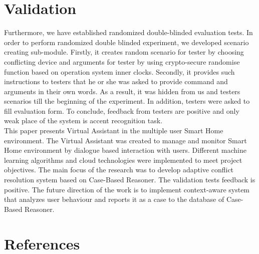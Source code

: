 \documentclass{llncs}
\begin{document}
    \section{Validation}
    Furthermore, we have established randomized double-blinded evaluation tests. In order to perform randomized double
    blinded experiment, we developed scenario creating sub-module. Firstly, it creates random scenario for tester by choosing
    conflicting device and arguments for tester by using crypto-secure randomise function based on operation system inner
    clocks. Secondly, it provides such instructions to testers that he or she was
    asked to provide command and arguments in their own words. As a result, it was hidden from us and testers scenarios till
    the beginning of the experiment. In addition, testers were asked to fill evaluation form. To conclude, feedback from
    testers are positive and only weak place of the system is accent recognition task.\\
    This paper presents Virtual Assistant in the multiple user Smart Home environment. The Virtual Assistant was created
    to manage and monitor Smart Home environment by dialogue based interaction with users. Different machine learning
    algorithms and cloud technologies were implemented to meet project objectives. The main focus of the research was to
    develop adaptive conflict resolution system based on Case-Based Reasoner. The validation tests feedback is positive.
    The future direction of the work is to implement context-aware system that analyzes user behaviour and reports it as
    a case to the database of Case-Based Reasoner.

    \section{References}
    
    
\end{document}
